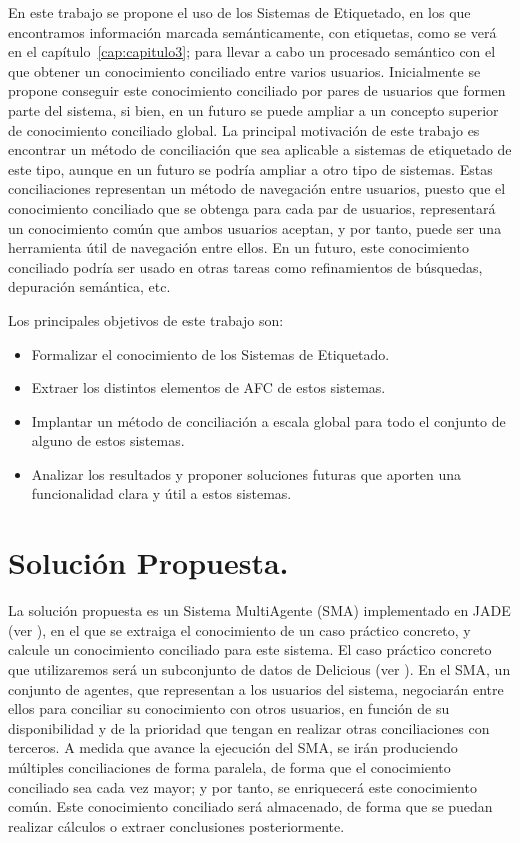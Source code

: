 En este trabajo se propone el uso de los Sistemas de Etiquetado, en los que encontramos información marcada semánticamente, con etiquetas, como se verá en el capítulo~\ref{cap:capitulo3}; para llevar a cabo un procesado semántico con el que obtener un conocimiento conciliado entre varios usuarios. Inicialmente se propone conseguir este conocimiento conciliado por pares de usuarios que formen parte del sistema, si bien, en un futuro se puede ampliar a un concepto superior de conocimiento conciliado global. La principal motivación de este trabajo es encontrar un método de conciliación que sea aplicable a sistemas de etiquetado de este tipo, aunque en un futuro se podría ampliar a otro tipo de sistemas. Estas conciliaciones representan un método de navegación entre usuarios, puesto que el conocimiento conciliado que se obtenga para cada par de usuarios, representará un conocimiento común que ambos usuarios aceptan, y por tanto, puede ser una herramienta útil de navegación entre ellos. En un futuro, este conocimiento conciliado podría ser usado en otras tareas como refinamientos de búsquedas, depuración semántica, etc.

Los principales objetivos de este trabajo son:

\begin{itemize}
	\item Formalizar el conocimiento de los Sistemas de Etiquetado.
	\item Extraer los distintos elementos de AFC de estos sistemas.
	\item Implantar un método de conciliación a escala global para todo el conjunto de alguno de estos sistemas.
	\item Analizar los resultados y proponer soluciones futuras que aporten una funcionalidad clara y útil a estos sistemas.
\end{itemize}





\section*{Solución Propuesta.}

La solución propuesta es un Sistema MultiAgente (SMA) implementado en JADE (ver \cite{jade}), en el que se extraiga el conocimiento de un caso práctico concreto, y calcule un conocimiento conciliado para este sistema. El caso práctico concreto que utilizaremos será un subconjunto de datos de Delicious (ver \cite{delicious}). En el SMA, un conjunto de agentes, que representan a los usuarios del sistema, negociarán entre ellos para conciliar su conocimiento con otros usuarios, en función de su disponibilidad y de la prioridad que tengan en realizar otras conciliaciones con terceros. A medida que avance la ejecución del SMA, se irán produciendo múltiples conciliaciones de forma paralela, de forma que el conocimiento conciliado sea cada vez mayor; y por tanto, se enriquecerá este conocimiento común. Este conocimiento conciliado será almacenado, de forma que se puedan realizar cálculos o extraer conclusiones posteriormente.

